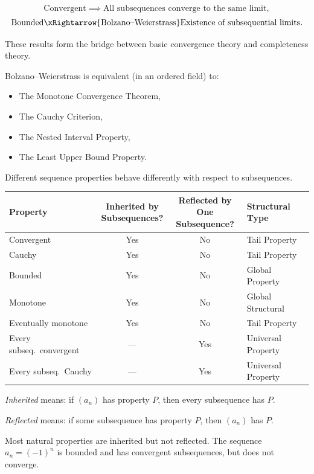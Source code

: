 \begin{remark}
\[
\text{Convergent}
\implies
\text{All subsequences converge to the same limit},
\]
\[
\text{Bounded}
\xRightarrow{\text{Bolzano--Weierstrass}}
\text{Existence of subsequential limits}.
\]

These results form the bridge between basic convergence
theory and completeness theory.

Bolzano--Weierstrass is equivalent (in an ordered field) to:
\begin{itemize}
\item The Monotone Convergence Theorem,
\item The Cauchy Criterion,
\item The Nested Interval Property,
\item The Least Upper Bound Property.
\end{itemize}
\end{remark}


\begin{remark}
Different sequence properties behave differently with respect to subsequences.
\end{remark}

\begin{center}
\begin{tabular}{|l|c|c|l|}
\hline
\textbf{Property} 
& \makecell{\textbf{Inherited by} \\ \textbf{Subsequences?}} 
& \makecell{\textbf{Reflected by One} \\ \textbf{Subsequence?}}
& \textbf{Structural Type} \\
\hline
Convergent 
& Yes 
& No 
& Tail Property \\
\hline
Cauchy 
& Yes 
& No 
& Tail Property \\
\hline
Bounded 
& Yes 
& No 
& Global Property \\
\hline
Monotone 
& Yes 
& No 
& Global Structural \\
\hline
Eventually monotone 
& Yes 
& No 
& Tail Property \\
\hline
Every subseq.\ convergent 
& --- 
& Yes 
& Universal Property \\
\hline
Every subseq.\ Cauchy 
& --- 
& Yes 
& Universal Property \\
\hline
\end{tabular}
\end{center}

\begin{remark}
\emph{Inherited} means: if $(a_n)$ has property $P$, then every subsequence has $P$.

\emph{Reflected} means: if some subsequence has property $P$, then $(a_n)$ has $P$.

Most natural properties are inherited but not reflected. The sequence
$a_n = (-1)^n$ is bounded and has convergent subsequences, but does not converge.
\end{remark}